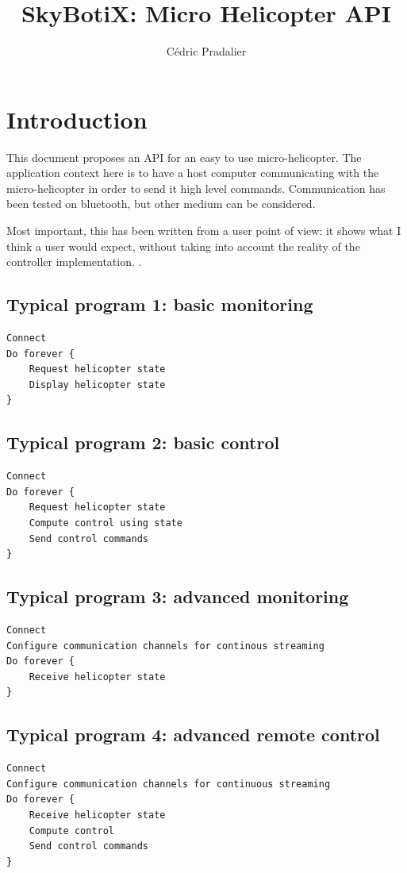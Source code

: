 \documentclass{article}
\title{SkyBotiX: Micro Helicopter API}
\author{C\'edric Pradalier}
\begin{document}
\maketitle

\section{Introduction}
\label{sec:intro}
This document proposes an API for an easy to use micro-helicopter. The
application context here is to have a host computer communicating with the
micro-helicopter in order to send it high level commands. Communication has
been tested on bluetooth, but other medium can be considered. 

Most important, this has been written from a user point of view: it shows what
I think a user would expect, without taking into account the reality of the
controller implementation. .

\subsection{Typical program 1: basic monitoring}
\begin{verbatim}
Connect
Do forever {
    Request helicopter state
    Display helicopter state
}
\end{verbatim}

\subsection{Typical program 2: basic control}
\begin{verbatim}
Connect
Do forever {
    Request helicopter state
    Compute control using state
    Send control commands
}
\end{verbatim}

\subsection{Typical program 3: advanced monitoring}
\begin{verbatim}
Connect
Configure communication channels for continous streaming
Do forever {
    Receive helicopter state
}
\end{verbatim}

\subsection{Typical program 4: advanced remote control}
\begin{verbatim}
Connect
Configure communication channels for continuous streaming
Do forever {
    Receive helicopter state
    Compute control
    Send control commands
}
\end{verbatim}
\end{document}
